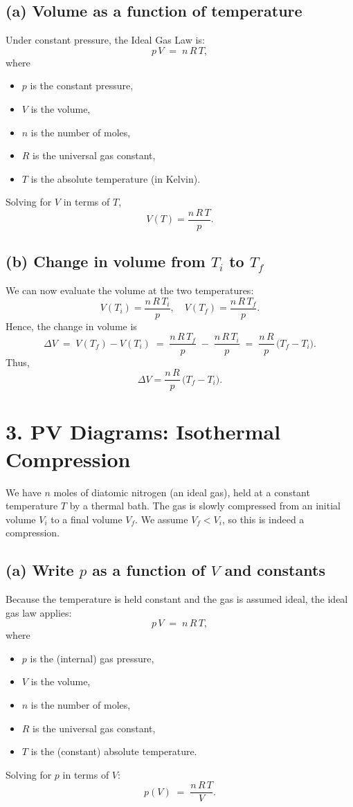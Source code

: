 \documentclass[12pt]{article}
\theoremstyle{definition} %
\theoremstyle{plain} %
\begin{document}
\subsection*{(a) Volume as a function of temperature}

\noindent
Under constant pressure, the Ideal Gas Law is:
\[
p\,V \;=\; n\,R\,T,
\]
where
\begin{itemize}
    \item $p$ is the constant pressure,
    \item $V$ is the volume,
    \item $n$ is the number of moles,
    \item $R$ is the universal gas constant,
    \item $T$ is the absolute temperature (in Kelvin).
\end{itemize}

\noindent
Solving for $V$ in terms of $T$,
\[
\boxed{V(T) = \frac{n\,R\,T}{p}.}
\]

\subsection*{(b) Change in volume from $T_i$ to $T_f$}

\noindent
We can now evaluate the volume at the two temperatures:
\[
V(T_i) = \frac{n\,R\,T_i}{p},
\quad
V(T_f) = \frac{n\,R\,T_f}{p}.
\]
Hence, the change in volume is
\[
\Delta V
\;=\;
V(T_f) - V(T_i)
\;=\;
\frac{n\,R\,T_f}{p} 
\;-\; 
\frac{n\,R\,T_i}{p}
\;=\;
\frac{n\,R}{p}\,\bigl(T_f - T_i\bigr).
\]
Thus,
\[
\boxed{\Delta V
= \frac{n\,R}{p}\,\bigl(T_f - T_i\bigr).
}
\]

\section*{3. PV Diagrams: Isothermal Compression}

We have $n$ moles of diatomic nitrogen (an ideal gas), held at a constant temperature $T$
by a thermal bath. The gas is slowly compressed from an initial volume $V_i$ to a final volume $V_f$.
We assume $V_f < V_i$, so this is indeed a compression.

\subsection*{(a) Write \texorpdfstring{$p$}{p} as a function of \texorpdfstring{$V$}{V} and constants}

Because the temperature is held constant and the gas is assumed ideal, the ideal gas law applies:
\[
p\,V \;=\; n\,R\,T,
\]
where
\begin{itemize}
  \item $p$ is the (internal) gas pressure,
  \item $V$ is the volume,
  \item $n$ is the number of moles,
  \item $R$ is the universal gas constant,
  \item $T$ is the (constant) absolute temperature.
\end{itemize}
Solving for $p$ in terms of $V$:
\[
\boxed{p(V) \;=\; \frac{n\,R\,T}{V}.}
\]
\end{document}
